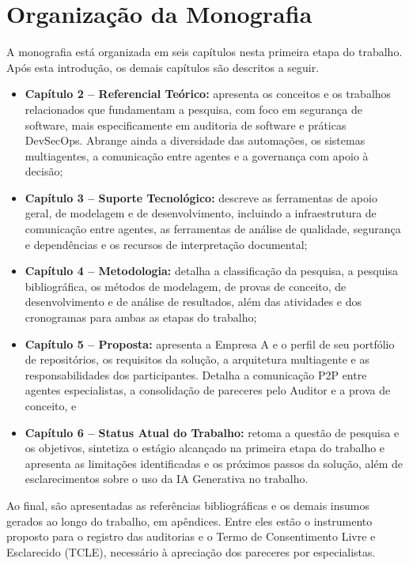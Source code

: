 \section{Organização da Monografia}
\label{intro-organizacao}

A monografia está organizada em seis capítulos nesta primeira etapa do trabalho. Após esta introdução, os demais capítulos são descritos a seguir.

\begin{itemize}
    \item \textbf{Capítulo 2 -- Referencial Teórico:} apresenta os conceitos e os trabalhos relacionados que fundamentam a pesquisa, com foco em segurança de software, mais especificamente em auditoria de software e práticas DevSecOps. Abrange ainda a diversidade das automações, os sistemas multiagentes, a comunicação entre agentes e a governança com apoio à decisão;
    \item \textbf{Capítulo 3 -- Suporte Tecnológico:} descreve as ferramentas de apoio geral, de modelagem e de desenvolvimento, incluindo a infraestrutura de comunicação entre agentes, as ferramentas de análise de qualidade, segurança e dependências e os recursos de interpretação documental;
    \item \textbf{Capítulo 4 -- Metodologia:} detalha a classificação da pesquisa, a pesquisa bibliográfica, os métodos de modelagem, de provas de conceito, de desenvolvimento e de análise de resultados, além das atividades e dos cronogramas para ambas as etapas do trabalho;
    \item \textbf{Capítulo 5 -- Proposta:} apresenta a Empresa A e o perfil de seu portfólio de repositórios, os requisitos da solução, a arquitetura multiagente e as responsabilidades dos participantes. Detalha a comunicação P2P entre agentes especialistas, a consolidação de pareceres pelo Auditor e a prova de conceito, e
    \item \textbf{Capítulo 6 -- Status Atual do Trabalho:} retoma a questão de pesquisa e os objetivos, sintetiza o estágio alcançado na primeira etapa do trabalho e apresenta as limitações identificadas e os próximos passos da solução, além de esclarecimentos sobre o uso da IA Generativa no trabalho.
\end{itemize}

Ao final, são apresentadas as referências bibliográficas e os demais insumos gerados ao longo do trabalho, em apêndices. Entre eles estão o instrumento proposto para o registro das auditorias e o Termo de Consentimento Livre e Esclarecido (TCLE), necessário à apreciação dos pareceres por especialistas.
